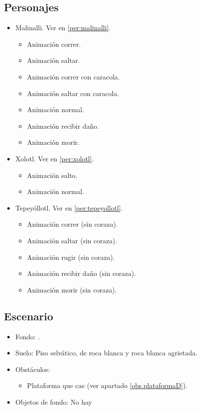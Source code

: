 	\subsection{Personajes}
	\begin{itemize}
		\item Malinalli. Ver en \ref{per:malinalli}.
		\begin{itemize}
			\item Animación correr.
			\item Animación saltar.
			\item Animación correr con caracola.
			\item Animación saltar con caracola.
			\item Animación normal.
			\item Animación recibir daño.
			\item Animación morir.
		\end{itemize} 
		\item Xolotl. Ver en \ref{per:xolotl}.
		\begin{itemize}
				\item Animación salto.
				\item Animación normal.
		\end{itemize}
		\item Tepeyóllotl. Ver en \ref{per:tepeyollotl}.
		\begin{itemize}
			\item Animación correr (sin coraza).
			\item Animación saltar (sin coraza).
			\item Animación rugir (sin coraza).
			\item Animación recibir daño (sin coraza).
			\item Animación morir (sin coraza).
		\end{itemize}
	\end{itemize}
	\subsection{Escenario}
\begin{itemize} 
	\item Fondo: .
	\item Suelo: Piso selvático, de roca blanca y roca blanca agrietada.
	\item Obstáculos:
	\begin{itemize}
		item Plataforma móvil (ver apartado \ref{obs.plataformaM}).
			\item Plataforma que cae (ver apartado \ref{obs.plataformaD}).
	\end{itemize}
	\item Objetos de fondo: No hay
\end{itemize}		
